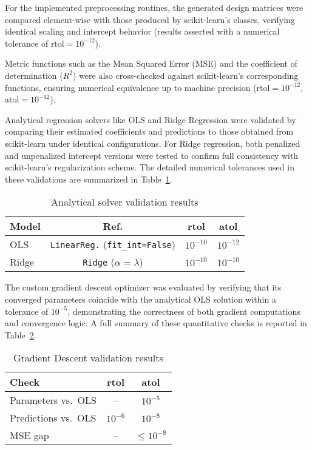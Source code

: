 \documentclass[
 reprint,            %
 amsmath,amssymb,
 aps,
]{revtex4-2}
\begin{document}
For the implemented preprocessing routines, the generated design matrices were compared element-wise with those produced by scikit-learn's classes, verifying identical scaling and intercept behavior (results asserted with a numerical tolerance of \(\text{rtol}=10^{-12}\)).

Metric functions such as the Mean Squared Error (MSE) and the coefficient of determination ($R^2$) were also cross-checked against scikit-learn's corresponding functions, ensuring numerical equivalence up to machine precision (\(\text{rtol}=10^{-12}\), \(\text{atol}=10^{-12}\)).

Analytical regression solvers like OLS and Ridge Regression were validated by comparing their estimated coefficients and predictions to those obtained from scikit-learn under identical configurations. 
For Ridge regression, both penalized and unpenalized intercept versions were tested to confirm full consistency with scikit-learn's regularization scheme. 
The detailed numerical tolerances used in these validations are summarized in Table~\ref{tab:analytical_solvers}.

\begin{table}[H]
\centering
\small
\setlength{\tabcolsep}{3pt}
\caption{Analytical solver validation results}
\label{tab:analytical_solvers}
\begin{tabular}{lccc}
\toprule
\textbf{Model} & \textbf{Ref.} & \textbf{rtol} & \textbf{atol} \\
\midrule
OLS & \texttt{LinearReg.} (\texttt{fit\_int=False}) & $10^{-10}$ & $10^{-12}$ \\
Ridge & \texttt{Ridge} ($\alpha=\lambda$) & $10^{-10}$ & $10^{-10}$ \\
\bottomrule
\end{tabular}
\end{table}

The custom gradient descent optimizer was evaluated by verifying that its converged parameters coincide with the analytical OLS solution within a tolerance of $10^{-5}$, demonstrating the correctness of both gradient computations and convergence logic. 
A full summary of these quantitative checks is reported in Table~\ref{tab:gd_validation}.

\begin{table}[H]
\centering
\small
\setlength{\tabcolsep}{3pt}
\caption{Gradient Descent validation results}
\label{tab:gd_validation}
\begin{tabular}{lcc}
\toprule
\textbf{Check} & \textbf{rtol} & \textbf{atol} \\
\midrule
Parameters vs.\ OLS & – & $10^{-5}$ \\
Predictions vs.\ OLS & $10^{-6}$ & $10^{-8}$ \\
MSE gap & – & $\le 10^{-8}$ \\
\bottomrule
\end{tabular}
\end{table}
\end{document}
